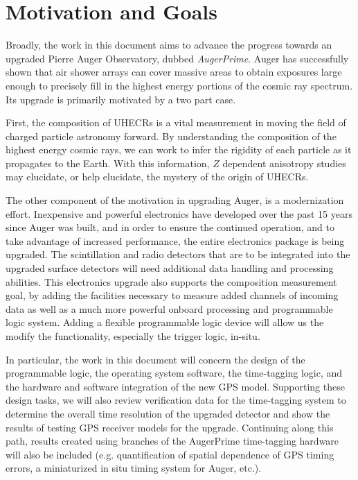 \section{Motivation and Goals}
Broadly, the work in this document aims to advance the progress towards an upgraded Pierre Auger Observatory, dubbed \textit{AugerPrime}. Auger has successfully shown that air shower arrays can cover massive areas to obtain exposures large enough to precisely fill in the highest energy portions of the cosmic ray spectrum. Its upgrade is primarily motivated by a two part case. 

First, the composition of UHECRs is a vital measurement in moving the field of charged particle astronomy forward. By understanding the composition of the highest energy cosmic rays, we can work to infer the rigidity of each particle as it propagates to the Earth. With this information, $Z$ dependent anisotropy studies may elucidate, or help elucidate, the mystery of the origin of UHECRs.

The other component of the motivation in upgrading Auger, is a modernization effort. Inexpensive and powerful electronics have developed over the past 15 years since Auger was built, and in order to ensure the continued operation, and to take advantage of increased performance, the entire electronics package is being upgraded. The scintillation and radio detectors that are to be integrated into the upgraded surface detectors will need additional data handling and processing abilities. This electronics upgrade also supports the composition measurement goal, by adding the facilities necessary to measure added channels of incoming data as well as a much more powerful onboard processing and programmable logic system. Adding a flexible programmable logic device will allow us the modify the functionality, especially the trigger logic, in-situ. 

In particular, the work in this document will concern the design of the programmable logic, the operating system software, the time-tagging logic, and the hardware and software integration of the new GPS model. Supporting these design tasks, we will also review verification data for the time-tagging system to determine the overall time resolution of the upgraded detector and show the results of testing GPS receiver models for the upgrade. Continuing along this path, results created using branches of the AugerPrime time-tagging hardware will also be included (e.g. quantification of spatial dependence of GPS timing errors, a miniaturized in situ timing system for Auger\@TA, etc.).

